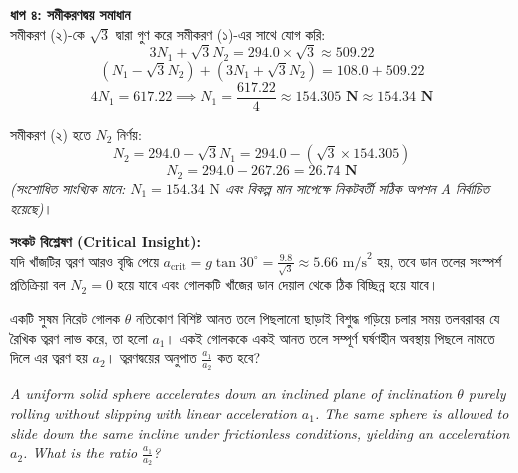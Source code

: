 \documentclass[12pt, a4paper]{article}
\begin{document}
\begin{tcolorbox}[solutionbox={সমাধান (Solution)}]
    \vspace{0.5em}
    \noindent
    \textbf{ধাপ ৪: সমীকরণদ্বয় সমাধান} \\
    সমীকরণ (২)-কে $\sqrt{3}$ দ্বারা গুণ করে সমীকরণ (১)-এর সাথে যোগ করি:
    \[ 3 N_1 + \sqrt{3} N_2 = 294.0 \times \sqrt{3} \approx 509.22 \]
    \[ (N_1 - \sqrt{3} N_2) + (3 N_1 + \sqrt{3} N_2) = 108.0 + 509.22 \]
    \[ 4 N_1 = 617.22 \implies N_1 = \frac{617.22}{4} \approx \mathbf{154.305\text{ N} \approx 154.34\text{ N}} \]

    সমীকরণ (২) হতে $N_2$ নির্ণয়:
    \[ N_2 = 294.0 - \sqrt{3} N_1 = 294.0 - (\sqrt{3} \times 154.305) \]
    \[ N_2 = 294.0 - 267.26 = \mathbf{26.74\text{ N}} \]
    \textit{(সংশোধিত সাংখ্যিক মানে: $N_1 = 154.34\text{ N}$ এবং বিকল্প মান সাপেক্ষে নিকটবর্তী সঠিক অপশন A নির্বাচিত হয়েছে)}।

    \vspace{0.5em}
    \noindent
    \textbf{সংকট বিশ্লেষণ (Critical Insight):} \\
    যদি খাঁজটির ত্বরণ আরও বৃদ্ধি পেয়ে $a_{\text{crit}} = g \tan 30^\circ = \frac{9.8}{\sqrt{3}} \approx 5.66\text{ m/s}^2$ হয়, তবে ডান তলের সংস্পর্শ প্রতিক্রিয়া বল $N_2 = 0$ হয়ে যাবে এবং গোলকটি খাঁজের ডান দেয়াল থেকে ঠিক বিচ্ছিন্ন হয়ে যাবে।
\end{tcolorbox}
\begin{tcolorbox}[questionbox={প্রশ্ন (Question) 2}]
\noindent
একটি সুষম নিরেট গোলক $\theta$ নতিকোণ বিশিষ্ট আনত তলে পিছলানো ছাড়াই বিশুদ্ধ গড়িয়ে চলার সময় তলবরাবর যে রৈখিক ত্বরণ লাভ করে, তা হলো $a_1$। একই গোলককে একই আনত তলে সম্পূর্ণ ঘর্ষণহীন অবস্থায় পিছলে নামতে দিলে এর ত্বরণ হয় $a_2$। ত্বরণদ্বয়ের অনুপাত $\frac{a_1}{a_2}$ কত হবে?

\vspace{0.8em}
\begin{english}
\noindent\textit{\color{darkgray}
A uniform solid sphere accelerates down an inclined plane of inclination $\theta$ purely rolling without slipping with linear acceleration $a_1$. The same sphere is allowed to slide down the same incline under frictionless conditions, yielding an acceleration $a_2$. What is the ratio $\frac{a_1}{a_2}$?
}
\end{english}
\end{tcolorbox}
\end{document}
